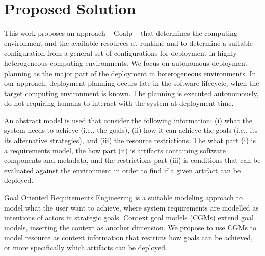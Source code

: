 \section{Proposed Solution}

This work proposes an approach – Goalp – that determines the computing environment and the available resources at runtime and to determine a suitable configuration from a general set of configurations for deployment in highly heterogeneous computing environments. We focus on autonomous deployment planning as the major part of the deployment in heterogeneous environments. In our approach, deployment planning occurs late in the software lifecycle, when the target computing environment is known. The planning is executed autonomously, do not requiring humans to interact with the system at deployment time.

An abstract model is used that consider the following information:
(i) what the system needs to achieve (i.e., the goals), (ii) how it can achieve the goals (i.e., its its alternative strategies), and (iii) the resource restrictions.
The what part (i) is a requirements model, the how part (ii) is artifacts containing software components and metadata, and the restrictions part (iii) is conditions that can be evaluated against the environment in order to find if a given artifact can be deployed.

Goal Oriented Requirements Engineering is a suitable modeling approach to model what the user want to achieve, where system requirements are modelled as intentions of actors in strategic goals\cite{yu_modelling_1996}\cite{bresciani_tropos:_2004}\cite{dardenne_goal-directed_1993}. Context goal models (CGMs) extend goal models\cite{ali_goal-based_2010}, inserting the context as another dimension. We propose to use CGMs to model resource as context information that restricts how goals can be achieved, or more specifically which artifacts can be deployed.




